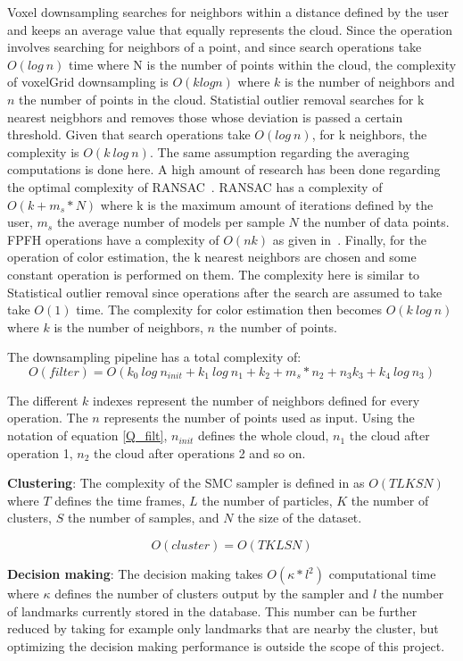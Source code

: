 \documentclass[twoside,hidelinks]{article}
\begin{document}
Voxel downsampling searches for neighbors within a distance defined by the user and keeps an average value that equally represents the cloud. Since the operation involves searching for neighbors of a point, and since search operations take $O(log\ n)$ time where N is the number of points within the cloud, the complexity of voxelGrid downsampling is $O(k log n)$ where $k$ is the number of neighbors and $n$ the number of points in the cloud. 
Statistial outlier removal searches for k nearest neigbhors and removes those whose deviation is passed a certain threshold. Given that search operations take $O(log\ n)$, for k neighbors, the complexity is $O(k\ log\ n)$. The same assumption regarding the averaging computations is done here.
A high amount of research has been done regarding the optimal complexity of RANSAC~\cite{RANSAC}. RANSAC has a complexity of $ O(k+ m_s*N)$ where k is the maximum amount of iterations defined by the user, $m_s$ the average number of models per sample $N$ the number of data points.
FPFH operations have a complexity of $O(nk)$ as given in~\cite{fpfh}.
Finally, for the operation of color estimation, the k nearest neighbors are chosen and some constant operation is performed on them. The complexity here is similar to Statistical outlier removal since operations after the search are assumed to take take $O(1)$ time. The complexity for color estimation then becomes $O(k\ log\ n)$ where $k$ is the number of neighbors, $n$ the number of points. 

The downsampling pipeline has a total complexity of:
\begin{equation} \label{Q_filt}
O(filter) = O(k_{0}\ log\ n_{init} + k_{1}\ log\ n_{1} + k_{2}+ m_s*n_{2} + n_{3}k_{3} + k_{4}\ log\ n_{3} )
\end{equation}

The different $k$ indexes represent the number of neighbors defined for every operation. The $n$ represents the number of points used as input. Using the notation of equation \ref{Q_filt}, $n_{init}$ defines the whole cloud, $n_1$ the cloud after operation 1, $n_2$ the cloud after operations 2 and so on.

\textbf{Clustering}: The complexity of the SMC sampler is defined in \cite{smcddp} as $O(TLKSN)$ where $T$ defines the time frames, $L$ the number of particles, $K$ the number of clusters, $S$ the number of samples, and $N$ the size of the dataset. 

$$
O(cluster) = O(TKLSN)
$$

\textbf{Decision making}: The decision making takes $ O(\kappa * l^2) $ computational time where $\kappa$ defines the number of clusters output by the sampler and $l$ the number of landmarks currently stored in the database. This number can be further reduced by taking for example only landmarks that are nearby the cluster, but optimizing the decision making performance is outside the scope of this project.
\end{document}
